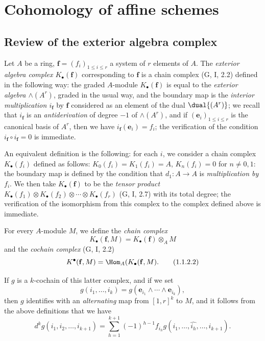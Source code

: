 \section{Cohomology of affine schemes}
\label{section:III.1}

\subsection{Review of the exterior algebra complex}
\label{subsection:III.1.1}

\begin{env}[1.1.1]
\label{III.1.1.1}
Let $A$ be a ring, $\mathbf{f}=(f_i)_{1\leq i\leq r}$ a system of $r$ elements of $A$.
The \emph{exterior algebra complex $K_\bullet(\mathbf{f})$} corresponding to $\mathbf{f}$ is a chain complex (G, I, 2.2) defined in the following way: the graded $A$-module $K_\bullet(\mathbf{f})$ is equal to the \emph{exterior algebra $\wedge(A^r)$}, graded in the usual way, and the boundary map is the \emph{interior multiplication $i_\mathbf{f}$} by $\mathbf{f}$ considered as an element of the dual $\dual{(A^r)}$; we recall that $i_\mathbf{f}$ is an \emph{antiderivation} of degree $-1$ of $\wedge(A^r)$, and if $(\mathbf{e}_i)_{1\leq i\leq r}$ is the canonical basis of $A^r$, then we have $i_\mathbf{f}(\mathbf{e}_i)=f_i$; the verification of the condition $i_\mathbf{f}\circ i_\mathbf{f}=0$ is immediate.

An equivalent definition is the following: for each $i$, we consider a chain complex $K_\bullet(f_i)$ defined as follows: $K_0(f_i)=K_1(f_i)=A$, $K_n(f_i)=0$ for $n\neq 0,1$: the boundary map is defined by the condition that $d_1:A\to A$ is \emph{multiplication by $f_i$}.
We then take $K_\bullet(\mathbf{f})$ to be the \emph{tensor product $K_\bullet(f_1)\otimes K_\bullet(f_2)\otimes\cdots\otimes K_\bullet(f_r)$} (G, I, 2.7) with its total degree; the verification of the isomorphism from this complex to the complex defined above is immediate.
\end{env}

\begin{env}[1.1.2]
\label{III.1.1.2}
For every $A$-module $M$, we define the \emph{chain complex}
\[
\label{III.1.1.2.1}
  K_\bullet(\mathbf{f},M)=K_\bullet(\mathbf{f})\otimes_A M
  \tag{1.1.2.1}
\]
and the \emph{cochain complex} (G, I, 2.2)
\[
\label{III.1.1.2.2}
  K^\bullet(\mathbf{f},M)=\Hom_A(K_\bullet(\mathbf{f},M).
  \tag{1.1.2.2}
\]

If $g$ is a $k$-cochain of this latter complex, and if we set
\[
  g(i_1,\dots,i_k)=g(\mathbf{e}_{i_1}\wedge\cdots\wedge\mathbf{e}_{i_k}),
\]
then $g$ identifies with an \emph{alternating} map from $[1,r]^k$ to $M$, and it follows from the above definitions that we have
\[
\label{III.1.1.2.3}
  d^k g(i_1,i_2,\dots,i_{k+1})=\sum_{h=1}^{k+1}(-1)^{h-1}f_{i_h}g(i_1,\dots,\widehat{i_h},\dots,i_{k+1}).
  \tag{1.1.2.3}
\]
\end{env}

